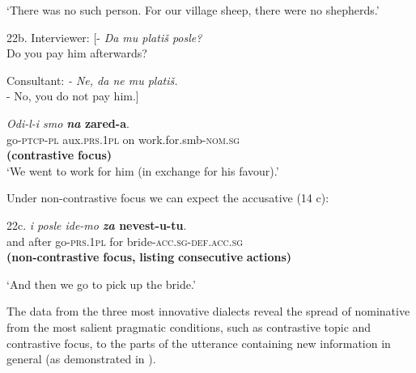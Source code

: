 \documentclass[output=paper]{langscibook}
\begin{document}
       ‘There was no such person. For our village sheep, there were no shepherds.’

22b.  Interviewer: [- \textit{Da mu platiš posle?} \\
 Do you pay him afterwards?

 Consultant:   \textit{{}-  Ne, da ne mu platiš.   \\
} {}- No, you do not pay him.]      

 \textit{Odi-l-i             smo} \textbf{\textit{na}   \textbf{zared-a}}.\\
                                       go-\textsc{ptcp-pl}     aux.\textsc{prs.1pl}   on  work.for.smb-\textsc{nom.sg} \\
                                                                          \textbf{(contrastive} \textbf{focus)}\\
             ‘We went to work for him (in exchange for his favour).’    

Under non-contrastive focus we can expect the accusative (14 c): 

22c.    \textit{i        posle ide-mo} \textbf{\textit{za}  \textbf{nevest-u{}-tu}}.\\
 and after   go-\textsc{prs.1pl}   for bride-\textsc{acc.sg-def.acc.sg} \\
                                              \textbf{(non-contrastive} \textbf{focus,} \textbf{listing} \textbf{consecutive} \textbf{actions)}

            ‘And then we go to pick up the bride.’  

The data from the three most innovative dialects reveal the spread of nominative from the most salient pragmatic conditions, such as contrastive topic and contrastive focus, to the parts of the utterance containing new information in general (as demonstrated in ). 
\end{document}
